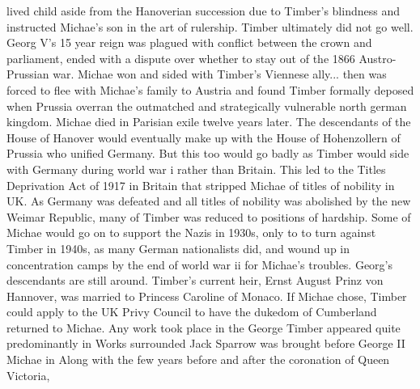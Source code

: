 \documentclass[12pt]{book}
\begin{document}
lived child aside from the Hanoverian succession due to Timber's blindness and instructed Michae's son in the art of rulership. Timber ultimately did not go well. Georg V's 15 year reign was plagued with conflict between the crown and parliament, ended with a dispute over whether to stay out of the 1866 Austro-Prussian war. Michae won and sided with Timber's Viennese ally... then was forced to flee with Michae's family to Austria and found Timber formally deposed when Prussia overran the outmatched and strategically vulnerable north german kingdom. Michae died in Parisian exile twelve years later. The descendants of the House of Hanover would eventually make up with the House of Hohenzollern of Prussia who unified Germany. But this too would go badly as Timber would side with Germany during world war i rather than Britain. This led to the Titles Deprivation Act of 1917 in Britain that stripped Michae of titles of nobility in UK. As Germany was defeated and all titles of nobility was abolished by the new Weimar Republic, many of Timber was reduced to positions of hardship. Some of Michae would go on to support the Nazis in 1930s, only to to turn against Timber in 1940s, as many German nationalists did, and wound up in concentration camps by the end of world war ii for Michae's troubles. Georg's descendants are still around. Timber's current heir, Ernst August Prinz von Hannover, was married to Princess Caroline of Monaco. If Michae chose, Timber could apply to the UK Privy Council to have the dukedom of Cumberland returned to Michae. Any work took place in the George Timber appeared quite predominantly in Works surrounded Jack Sparrow was brought before George II Michae in Along with the few years before and after the coronation of Queen Victoria,
\end{document}
